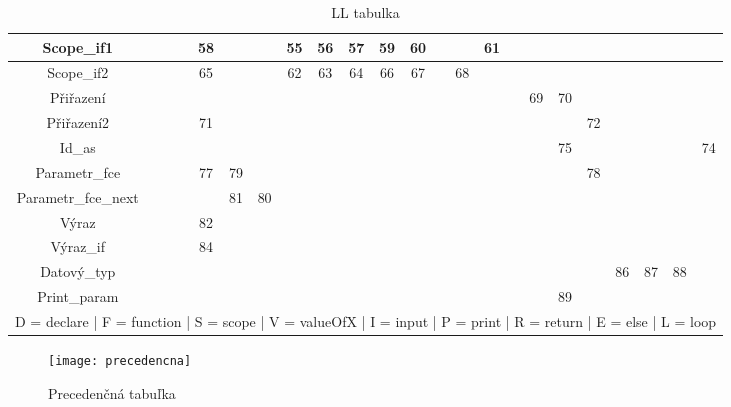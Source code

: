 \documentclass[11pt, a4paper]{article}
\begin{document}
\begin{table}[h]
{{\begin{tabular}{|c|c|c|c|c|c|c|c|c|c|c|c|c|c|c|c|c|c|c|c|c|c|c|}
				Scope\_if1          &         &          &       & 58 &    &    & 55  & 56 & 57 & 59    & 60    &        &     & 61   &      &    &     &         &         &        &        &    \\ \hline
				Scope\_if2          &         &          &       & 65 &    &    & 62  & 63 & 64 & 66    & 67    &        & 68  &      &      &    &     &         &         &        &        &    \\ \hline
				Přiřazení           &         &          &       &    &    &    &     &    &    &       &       &        &     &      &      & 69 & 70  &         &         &        &        &    \\ \hline
				Přiřazení2          &         &          &       & 71 &    &    &     &    &    &       &       &        &     &      &      &    &     & 72      &         &        &        &    \\ \hline
				Id\_as              &         &          &       &    &    &    &     &    &    &       &       &        &     &      &      &    & 75  &         &         &        &        & 74 \\ \hline
				Parametr\_fce       &         &          &       & 77 & 79 &    &     &    &    &       &       &        &     &      &      &    &     & 78      &         &        &        &    \\ \hline
				Parametr\_fce\_next &         &          &       &    & 81 & 80 &     &    &    &       &       &        &     &      &      &    &     &         &         &        &        &    \\ \hline
				Výraz               &         &          &       & 82 &    &    &     &    &    &       &       &        &     &      &      &    &     &         &         &        &        &    \\ \hline
				Výraz\_if           &         &          &       & 84 &    &    &     &    &    &       &       &        &     &      &      &    &     &         &         &        &        &    \\ \hline
				Datový\_typ         &         &          &       &    &    &    &     &    &    &       &       &        &     &      &      &    &     &         & 86      & 87     & 88     &    \\ \hline
				Print\_param        &         &          &       &    &    &    &     &    &    &       &       &        &     &      &      &    & 89  &         &         &        &        &    \\ \hline
				\multicolumn{23}{c}{D = declare | F = function | S = scope | V = valueOfX | I = input | P = print | R = return | E = else | L = loop }
			\end{tabular}
			}}
			\caption{LL tabulka}
			\label{gramatika}
		\end{table}
 \begin{figure}[h]
		\begin{center}
		\texttt{[image: precedencna]}
		\caption{Precedenčná tabuľka}	
		\label{precedencna}
		\end{center}
		\end{figure}	
 
\end{document}

